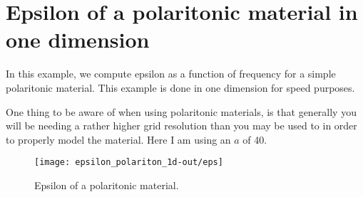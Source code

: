 \begin{comment}
#include <stdio.h>
#include <stdlib.h>
#include <signal.h>

#include <meep.h>
using namespace meep;
\end{comment}

\section{Epsilon of a polaritonic material in one dimension}

In this example, we compute epsilon as a function of frequency for a simple
polaritonic material.  This example is done in one dimension for speed
purposes.

One thing to be aware of when using polaritonic materials, is that
generally you will be needing a rather higher grid resolution than you may
be used to in order to properly model the material.  Here I am using an $a$
of 40.

\begin{figure}
\label{epsilon_polariton}
\caption{Epsilon of a polaritonic material.}
\texttt{[image: epsilon\_polariton\_1d-out/eps]}
\end{figure}


